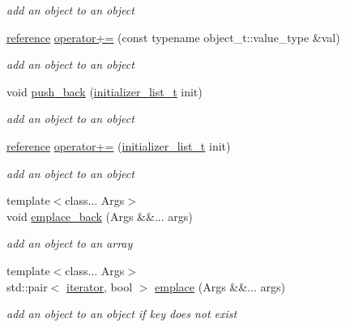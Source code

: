 \begin{DoxyCompactItemize}
\begin{DoxyCompactList}\small\item\em add an object to an object \end{DoxyCompactList}\item 
\hyperlink{classnlohmann_1_1basic__json_ac6a5eddd156c776ac75ff54cfe54a5bc}{reference} \hyperlink{classnlohmann_1_1basic__json_abf04978d85a2d5c4754f4806d42f46fd}{operator+=} (const typename object\+\_\+t\+::value\+\_\+type \&val)
\begin{DoxyCompactList}\small\item\em add an object to an object \end{DoxyCompactList}\item 
void \hyperlink{classnlohmann_1_1basic__json_a1be31ef2d2934d37a818083a4af44f99}{push\+\_\+back} (\hyperlink{classnlohmann_1_1basic__json_ad70a098fbc01c53497db29d3b5b656a9}{initializer\+\_\+list\+\_\+t} init)
\begin{DoxyCompactList}\small\item\em add an object to an object \end{DoxyCompactList}\item 
\hyperlink{classnlohmann_1_1basic__json_ac6a5eddd156c776ac75ff54cfe54a5bc}{reference} \hyperlink{classnlohmann_1_1basic__json_af245c2b6714d76ed99a2d02f2596d596}{operator+=} (\hyperlink{classnlohmann_1_1basic__json_ad70a098fbc01c53497db29d3b5b656a9}{initializer\+\_\+list\+\_\+t} init)
\begin{DoxyCompactList}\small\item\em add an object to an object \end{DoxyCompactList}\item 
{\footnotesize template$<$class... Args$>$ }\\void \hyperlink{classnlohmann_1_1basic__json_aacf5eed15a8b66fb1e88910707a5e229}{emplace\+\_\+back} (Args \&\&... args)
\begin{DoxyCompactList}\small\item\em add an object to an array \end{DoxyCompactList}\item 
{\footnotesize template$<$class... Args$>$ }\\std\+::pair$<$ \hyperlink{classnlohmann_1_1basic__json_a099316232c76c034030a38faa6e34dca}{iterator}, bool $>$ \hyperlink{classnlohmann_1_1basic__json_a5338e282d1d02bed389d852dd670d98d}{emplace} (Args \&\&... args)
\begin{DoxyCompactList}\small\item\em add an object to an object if key does not exist \end{DoxyCompactList}\item 

\end{DoxyCompactItemize}
